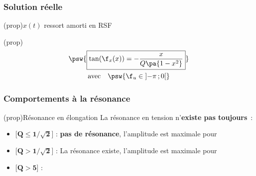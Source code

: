 \documentclass[../../main/main.tex]{subfiles}
\begin{document}
\subsubsection{Solution réelle}
\begin{tcb}(prop){$x(t)$ ressort amorti en RSF}
	\smallbreak
	\begin{isd}[interior hidden, sidebyside align=top](prop)
		\vspace{-15pt}
		\psw{%
			\[
				\boxed{
					X(x)
					= \abs{\Xu}
					= \frac{F_0/k}{
						\sqrt{ \pa{1 - x^2} ^2 + \pa{\dfrac{x}{Q}}^2}}
				}
			\]
		}%
		\vspace{-15pt}
		\tcblower
		\vspace{-15pt}
		\begin{gather*}
			\psw{%
				\boxed{\tan(\f_x(x)) = - \frac{x}{Q \pa{1 - x^2}}}
			}%
			\\\text{avec}
			\quad
			\psw{%
			\f_u \in \left] -\pi\,; 0 \right[
			}%
		\end{gather*}
		\vspace{-15pt}
	\end{isd}
\end{tcb}

\subsubsection{Comportements à la résonance}

\begin{tcb*}[breakable](prop){Résonance en élongation}
	La résonance en tension n'\textbf{existe pas toujours}~:
	\begin{itemize}[leftmargin=60pt]
		\item{}[$\mathbf{Q \leq 1/\sqrt{2}}$] :
		      \textbf{pas de résonance}, l'amplitude est maximale pour
		      \psw{%
			      \[\boxed{x = 0 \qet X(0) = \frac{F_0}{k}}\]
		      }%
		      \vspace{-15pt}
		\item{}[$\mathbf{Q > 1/\sqrt{2}}$] :
		      La résonance existe, l'amplitude est maximale pour
		      \psw{%
			      \[
				      \boxed{x_r = \frac{1}{Q} \sqrt{Q^{2} - \frac{1}{2}} < 1}
				      \qet
				      \boxed{X(x_r) = \frac{QF_0/k}{\sqrt{1 - \frac{1}{4Q^{2}}}}}
			      \]
		      }%
		      \vspace{-15pt}
		\item{}[$\mathbf{Q > 5}$] :
		      \leavevmode\vspace*{-15pt}\relax
		      \vspace{-15pt}
	\end{itemize}
\end{tcb*}
\end{document}
